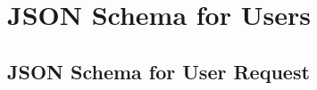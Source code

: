 %
%
%                 

\chapter{JSON Schema for Users}
\label{sec:appendixa}



\section{JSON Schema for User Request}
